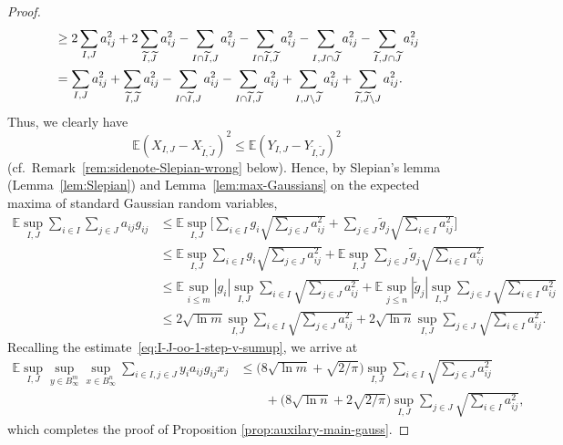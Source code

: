 \documentclass[a4paper]{amsart}
\theoremstyle{definition}
\theoremstyle{remark}
\numberwithin{equation}{section}
\newcommand*{\EE}{\mathbb{E}}
\begin{document}
\begin{proof}
\begin{align*}
	&\geq 2\sum_{I,J} a_{ij}^2
	+ 2\sum_{\widetilde{I}, \widetilde{J}} a_{ij}^2
	 	-  \sum_{I\cap \widetilde{I}, J \vphantom{\widetilde{J} -- cludge for moving position of limit down}} a_{ij}^2 - 	 \sum_{I\cap \widetilde{I},\widetilde{J} } a_{ij}^2
	- \sum_{I \vphantom{\widetilde{I} -- cludge for moving position of limit down}, J\cap \widetilde{J}} a_{ij}^2 - \sum_{\widetilde{I}, J\cap \widetilde{J}} a_{ij}^2\\
	&= \sum_{I, J} a_{ij}^2
	+ \sum_{\widetilde{I}, \widetilde{J}} a_{ij}^2
		-  \sum_{I\cap \widetilde{I}, J \vphantom{\widetilde{J} -- cludge for moving position of limit down}} a_{ij}^2 - 	 \sum_{I\cap \widetilde{I}, \widetilde{J} } a_{ij}^2
	+ \sum_{I \vphantom{\widetilde{I} -- cludge for moving position of limit down}, J\setminus \widetilde{J}}  a_{ij}^2 + \sum_{\widetilde{I}, \widetilde{J}\setminus J }   a_{ij}^2.
\end{align*}
Thus, we clearly have
\[
\EE (X_{I,J} - X_{\widetilde{I}, \widetilde{J}})^2 \leq 	\EE (Y_{I,J} - Y_{\widetilde{I}, \widetilde{J}})^2
\]
(cf.\ Remark~\ref{rem:sidenote-Slepian-wrong} below).
Hence, by Slepian's lemma (Lemma~\ref{lem:Slepian}) and Lemma~\ref{lem:max-Gaussians} on the expected maxima of standard Gaussian random variables,
\begin{align*}
\EE \sup_{I, J} \sum_{i\in I} \sum_{j\in J} a_{ij} g_{ij}
&\leq
\EE \sup_{I, J}  \Biggl[\sum_{i\in I} g_i \sqrt{\sum_{j\in J} a_{ij}^2 }
+ \sum_{j\in J} \widetilde{g}_j \sqrt{\sum_{i\in I} a_{ij}^2 } \Biggr]\\
&\leq
\EE \sup_{I, J}  \sum_{i\in I} g_i \sqrt{\sum_{j\in J} a_{ij}^2}
+ \EE \sup_{I, J} \sum_{j\in J} \widetilde{g}_j \sqrt{\sum_{i\in I} a_{ij}^2 } \\
&\leq
 \EE \sup_{i\leq m} |g_i| \sup_{I, J}  \sum_{i\in I}  \sqrt{\sum_{j\in J} a_{ij}^2}
	+\EE \sup_{j\leq n} |\widetilde{g}_j | \sup_{I, J}\sum_{j\in J} \sqrt{\sum_{i\in I} a_{ij}^2 } \\
	&\leq
2\sqrt{\ln m}	\sup_{I, J}  \sum_{i\in I}  \sqrt{\sum_{j\in J} a_{ij}^2}
	+2\sqrt{\ln n} \sup_{I, J} \sum_{j\in J} \sqrt{\sum_{i\in I} a_{ij}^2 } .
\end{align*}
Recalling the estimate~\eqref{eq:I-J-oo-1-step-v-sumup}, we arrive at
	\begin{align*}	
\EE \sup_{I, J} \sup_{y\in B_\infty^m}\sup_{x\in B_\infty^n}
\sum_{i\in I, j\in J} y_i a_{ij} g_{ij} x_j
&\leq
\bigl(8\sqrt{\ln m} + \sqrt{2/\pi}\bigr)	\sup_{I, J}  \sum_{i\in I}  \sqrt{\sum_{j\in J} a_{ij}^2} \nonumber\\
& \qquad + \bigl(8\sqrt{\ln n} +2 \sqrt{2/\pi}\bigr)  \sup_{I, J} \sum_{j\in J} \sqrt{\sum_{i\in I} a_{ij}^2 },
	\end{align*}
	which completes the proof of Proposition \ref{prop:auxilary-main-gauss}.
	\end{proof}
\end{document}
